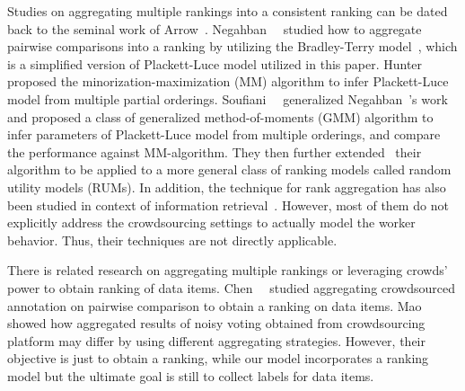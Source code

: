 Studies on aggregating multiple rankings into a consistent ranking can be dated back to the seminal work of Arrow~\cite{arrow2012social}.  
Negahban~\etal~\cite{negahban:nips2012} studied how to aggregate pairwise comparisons into a ranking 
by utilizing the Bradley-Terry model~\cite{bradley:1952}, which is a simplified version of Plackett-Luce model utilized in this paper.   
Hunter~\etal~\cite{hunter:aos2004} proposed the minorization-maximization (MM) algorithm to infer Plackett-Luce model 
from multiple partial orderings.  
Soufiani~\etal~\cite{soufiani:nips2013} generalized Negahban~\etal's work 
and proposed a class of generalized method-of-moments (GMM) algorithm 
to infer parameters of Plackett-Luce model from multiple orderings, 
and compare the performance against MM-algorithm.  
They then further extended~\cite{soufiani:icml2014} their algorithm 
to be applied to a more general class of ranking models called random utility models (RUMs).  
In addition, the technique for rank aggregation has also been studied 
in context of information retrieval~\cite{dwork:www2001,klementiev:icml2008,liu:www2007,qin:nips2010,volkovs:www2012}.  
However, most of them do not explicitly address the crowdsourcing settings 
to actually model the worker behavior.  
Thus, their techniques are not directly applicable. 

There is related research on aggregating multiple rankings or leveraging crowds' power to obtain ranking of data items.  
Chen~\etal~\cite{chen:wsdm2013} studied aggregating crowdsourced annotation on pairwise comparison to obtain a ranking on data items. 
Mao~\etal~\cite{mao:aaai2013} showed how aggregated results of noisy voting obtained from crowdsourcing platform 
may differ by using different aggregating strategies.  
However, their objective is just to obtain a ranking, 
while our model incorporates a ranking model but the ultimate goal is still to collect labels for data items.  



